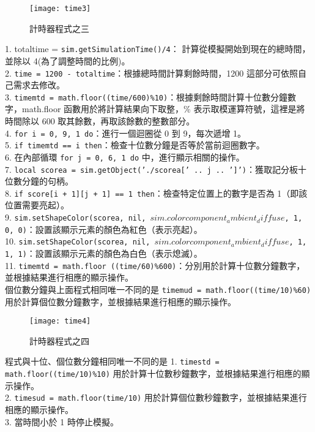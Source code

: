 \begin{figure}[hbt!]
\begin{center}
\texttt{[image: time3]}
\caption{\Large 計時器程式之三}\label{計時器程式之三}
\end{center}
\end{figure} 
1. totaltime = \texttt{sim.getSimulationTime()/4}： 計算從模擬開始到現在的總時間，並除以 4(為了調整時間的比例)。\\
2. \texttt{time = 1200 - totaltime}：根據總時間計算剩餘時間，1200 這部分可依照自己需求去修改。\\
3. \texttt{timemtd = math.floor((time/600)\%10)}：根據剩餘時間計算十位數分鐘數字，math.floor 函數用於將計算結果向下取整，\% 表示取模運算符號，這裡是將時間除以 600 取其餘數，再取該餘數的整數部分。\\
4. \texttt{for i = 0, 9, 1 do}：進行一個迴圈從 0 到 9，每次遞增 1。\\
5. \texttt{if timemtd == i then}：檢查十位數分鐘是否等於當前迴圈數字。\\
6. 在內部循環 \texttt{for j = 0, 6, 1 do} 中，進行顯示相關的操作。\\
7. \texttt{local scorea = sim.getObject('./scorea[' .. j .. ']')}：獲取記分板十位數分鐘的句柄。\\
8. \texttt{if score[i + 1][j + 1] == 1 then}：檢查特定位置上的數字是否為 1（即該位置需要亮起）。\\
9. \texttt{sim.setShapeColor(scorea, nil, $sim.colorcomponent_ambient_diffuse$, {1, 0, 0})}：設置該顯示元素的顏色為紅色（表示亮起）。\\
10. \texttt{sim.setShapeColor(scorea, nil, $sim.colorcomponent_ambient_diffuse$, {1, 1, 1})}：設置該顯示元素的顏色為白色（表示熄滅）。\\
11. \texttt{timemtd = math.floor ((time/60)\%600)}：分別用於計算十位數分鐘數字，並根據結果進行相應的顯示操作。\\
個位數分鐘與上面程式相同唯一不同的是 \texttt{timemud = math.floor((time/10)\%60)}用於計算個位數分鐘數字，並根據結果進行相應的顯示操作。\\
\newpage

\begin{figure}[hbt!]
\begin{center}
\texttt{[image: time4]}
\caption{\Large 計時器程式之四}\label{計時器程式之四}
\end{center}
\end{figure} 
程式與十位、個位數分鐘相同唯一不同的是 
1. \texttt{timestd = math.floor((time/10)\%10)} 用於計算十位數秒鐘數字，並根據結果進行相應的顯示操作。\\
2. \texttt{timesud = math.floor(time/10)} 用於計算個位數秒鐘數字，並根據結果進行相應的顯示操作。\\
3. 當時間小於 1 時停止模擬。\\
\newpage
\renewcommand{\baselinestretch}{1.0} %